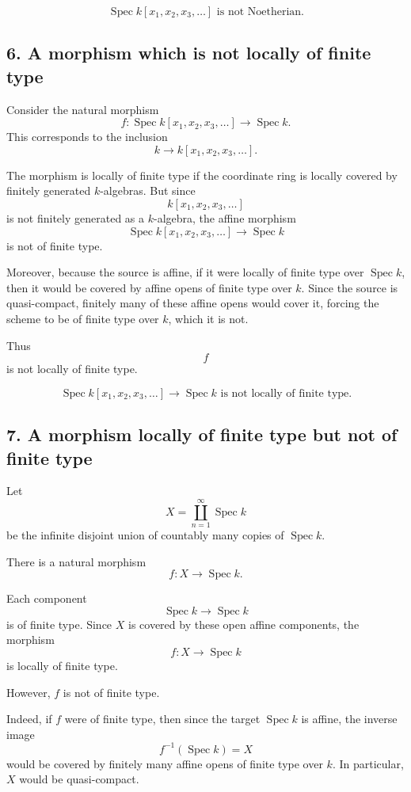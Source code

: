 \documentclass[12pt,a4paper]{article}
\theoremstyle{notespace}
\begin{document}
\[
\boxed{
	\operatorname{Spec} k[x_1,x_2,x_3,\dots]
	\text{ is not Noetherian.}
}
\]

\subsection*{6. A morphism which is not locally of finite type}

Consider the natural morphism
\[
f:\operatorname{Spec} k[x_1,x_2,x_3,\dots]\longrightarrow \operatorname{Spec}k.
\]
This corresponds to the inclusion
\[
k\longrightarrow k[x_1,x_2,x_3,\dots].
\]

The morphism is locally of finite type if the coordinate ring is locally covered by finitely generated \(k\)-algebras. But since
\[
k[x_1,x_2,x_3,\dots]
\]
is not finitely generated as a \(k\)-algebra, the affine morphism
\[
\operatorname{Spec} k[x_1,x_2,x_3,\dots]\to \operatorname{Spec}k
\]
is not of finite type.

Moreover, because the source is affine, if it were locally of finite type over \(\operatorname{Spec}k\), then it would be covered by affine opens of finite type over \(k\). Since the source is quasi-compact, finitely many of these affine opens would cover it, forcing the scheme to be of finite type over \(k\), which it is not.

Thus
\[
f
\]
is not locally of finite type.

\[
\boxed{
	\operatorname{Spec} k[x_1,x_2,x_3,\dots]\to \operatorname{Spec}k
	\text{ is not locally of finite type.}
}
\]

\subsection*{7. A morphism locally of finite type but not of finite type}

Let
\[
X=\coprod_{n=1}^{\infty}\operatorname{Spec}k
\]
be the infinite disjoint union of countably many copies of \(\operatorname{Spec}k\).

There is a natural morphism
\[
f:X\longrightarrow \operatorname{Spec}k.
\]

Each component
\[
\operatorname{Spec}k\to \operatorname{Spec}k
\]
is of finite type. Since \(X\) is covered by these open affine components, the morphism
\[
f:X\to \operatorname{Spec}k
\]
is locally of finite type.

However, \(f\) is not of finite type.

Indeed, if \(f\) were of finite type, then since the target \(\operatorname{Spec}k\) is affine, the inverse image
\[
f^{-1}(\operatorname{Spec}k)=X
\]
would be covered by finitely many affine opens of finite type over \(k\). In particular, \(X\) would be quasi-compact.
\end{document}
